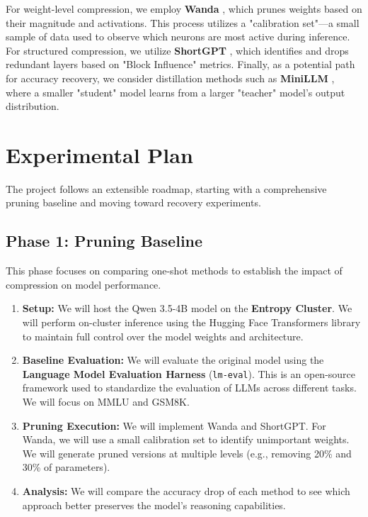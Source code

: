 \documentclass[11pt,a4paper,twocolumn]{article}
\begin{document}
For weight-level compression, we employ \textbf{Wanda} \cite{sun2023wanda}, which prunes weights based on their magnitude and activations. This process utilizes a "calibration set"—a small sample of data used to observe which neurons are most active during inference. For structured compression, we utilize \textbf{ShortGPT} \cite{men2024shortgpt}, which identifies and drops redundant layers based on "Block Influence" metrics. Finally, as a potential path for accuracy recovery, we consider distillation methods such as \textbf{MiniLLM} \cite{gu2023minillm}, where a smaller "student" model learns from a larger "teacher" model's output distribution.

\section{Experimental Plan}
The project follows an extensible roadmap, starting with a comprehensive pruning baseline and moving toward recovery experiments.

\subsection{Phase 1: Pruning Baseline}
This phase focuses on comparing one-shot methods to establish the impact of compression on model performance.
\begin{enumerate}
    \item \textbf{Setup:} We will host the Qwen 3.5-4B model on the \textbf{Entropy Cluster}. We will perform on-cluster inference using the Hugging Face Transformers library to maintain full control over the model weights and architecture.
    \item \textbf{Baseline Evaluation:} We will evaluate the original model using the \textbf{Language Model Evaluation Harness} (\texttt{lm-eval}). This is an open-source framework used to standardize the evaluation of LLMs across different tasks. We will focus on MMLU and GSM8K.
    \item \textbf{Pruning Execution:} We will implement Wanda and ShortGPT. For Wanda, we will use a small calibration set to identify unimportant weights. We will generate pruned versions at multiple levels (e.g., removing 20\% and 30\% of parameters).
    \item \textbf{Analysis:} We will compare the accuracy drop of each method to see which approach better preserves the model's reasoning capabilities.
\end{enumerate}
\end{document}
